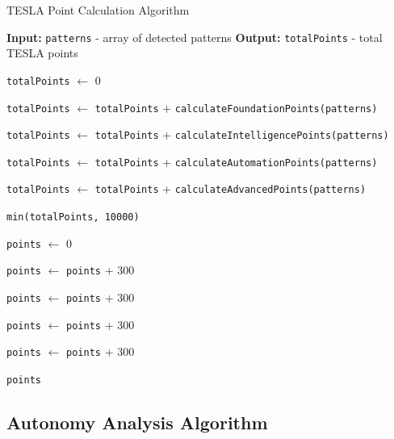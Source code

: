 \documentclass[10pt]{article}
\begin{document}
\begin{algorithm}[H]
\caption{TESLA Point Calculation Algorithm}
\label{algo:point-calculation}
\begin{algorithmic}[1]
    \State \textbf{Input:} \texttt{patterns} - array of detected patterns
    \State \textbf{Output:} \texttt{totalPoints} - total TESLA points
    
    \State \texttt{totalPoints} $\gets$ 0
    
    \State \texttt{totalPoints} $\gets$ \texttt{totalPoints} + \texttt{calculateFoundationPoints(patterns)}
    
    \State \texttt{totalPoints} $\gets$ \texttt{totalPoints} + \texttt{calculateIntelligencePoints(patterns)}
    
    \State \texttt{totalPoints} $\gets$ \texttt{totalPoints} + \texttt{calculateAutomationPoints(patterns)}
    
    \State \texttt{totalPoints} $\gets$ \texttt{totalPoints} + \texttt{calculateAdvancedPoints(patterns)}
    
    \State \Return \texttt{min(totalPoints, 10000)}
\EndFunction

    \State \texttt{points} $\gets$ 0
    
        \State \texttt{points} $\gets$ \texttt{points} + 300
    \EndIf
    
        \State \texttt{points} $\gets$ \texttt{points} + 300
    \EndIf
    
        \State \texttt{points} $\gets$ \texttt{points} + 300
    \EndIf
    
        \State \texttt{points} $\gets$ \texttt{points} + 300
    \EndIf
    
    \State \Return \texttt{points}
\EndFunction
\end{algorithmic}
\end{algorithm}

\subsection{Autonomy Analysis Algorithm}
\end{document}
